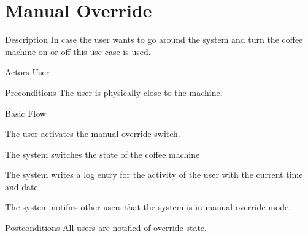 \section{Manual Override}


%
\begin{cpart}{Description}
In case the user wants to go around the system and turn the coffee machine on or off this use case is used.
\end{cpart}


%
\begin{cpart}{Actors}
User
\end{cpart}

%
\begin{cpart}{Preconditions}
The user is physically close to the machine.
\end{cpart}

%
\begin{cpartList}{Basic Flow}
  \item The user activates the manual override switch.
  \item The system switches the state of the coffee machine
\item The system writes a log entry for the activity of the user with the current time and date.
  \item The system notifies other users that the system is in manual override mode.
\end{cpartList}

%
\begin{cpart}{Postconditions}
  All users are notified of override state.
\end{cpart}

\clearpage
